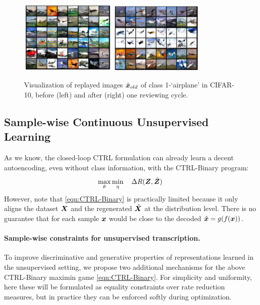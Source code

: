 \documentclass[../../book-main.tex]{subfiles}
\begin{document}
\begin{figure}
\centering
\includegraphics[width=0.41\textwidth]{chapters/chapter5/figs/memory_before_review_clip.png}
\includegraphics[width=0.4\textwidth]{chapters/chapter5/figs/memory_after_review_clip.png}
 \caption{\small Visualization of replayed images $\hat{\bm{x}}_{old}$ of class 1-`airplane' in CIFAR-10, before (left) and after (right) one reviewing cycle.} 
\label{fig:memory_review}
\end{figure}


\subsection{Sample-wise Continuous Unsupervised Learning}
\label{sec:sample-wise-incremental}

As we know, the closed-loop CTRL formulation can already learn a decent autoencoding, even without class information, with the  CTRL-Binary program:
\begin{align}
      \max_\theta \min_\eta \quad \Delta R(\bm{Z}, \hat{\bm{Z}}) 
 \label{eqn:CTRL-Binary}
\end{align}
However, note that \eqref{eqn:CTRL-Binary} is practically limited because it only aligns the dataset $\bm{X}$ and the regenerated $\hat {\bm{X}}$ at the distribution level. 
There is no guarantee that for each sample $\bm{x}$ would be close to the decoded $\hat {\bm{x}} = g(f(\bm{x}))$. 

\paragraph{Sample-wise constraints for unsupervised transcription.} 
\label{sec:constraints}
To improve discriminative and generative properties of representations learned in the unsupervised setting, we propose two additional mechanisms for the above CTRL-Binary maximin game \eqref{eqn:CTRL-Binary}.  For simplicity and uniformity, here these will be formulated as equality constraints over rate reduction measures, but in practice they can be enforced softly during optimization.
\end{document}
